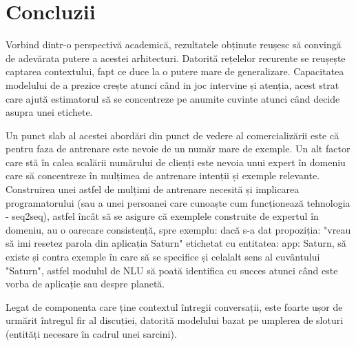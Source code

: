 \chapter{Concluzii}

Vorbind dintr-o perspectivă academică, rezultatele obținute reușesc să convingă de adevărata putere a acestei arhitecturi.
Datorită rețelelor recurente se reușește captarea contextului, fapt ce duce la o putere mare de generalizare. Capacitatea modelului de a prezice crește atunci când in joc intervine și atenția, acest strat care ajută estimatorul să se concentreze pe anumite cuvinte atunci când decide asupra unei etichete.

Un punct slab al acestei abordări din punct de vedere al comercializării este că pentru faza de antrenare este nevoie de un număr mare de exemple. Un alt factor care stă în calea scalării numărului de clienți este nevoia unui expert în domeniu care să concentreze în mulțimea de antrenare intenții și exemple relevante. Construirea unei astfel de mulțimi de antrenare necesită și implicarea programatorului (sau a unei persoanei care cunoaște cum funcționează tehnologia - seq2seq), astfel încât să se asigure că exemplele construite de expertul în domeniu, au o oarecare consistență, spre exemplu: dacă s-a dat propoziția: "vreau să imi resetez parola din aplicația Saturn" etichetat cu entitatea: app: Saturn, să existe și contra exemple în care să se specifice și celalalt sens al cuvântului "Saturn", astfel modulul de NLU să poată identifica cu succes atunci când este vorba de aplicație sau despre planetă.

Legat de componenta care ține contextul întregii conversații, este foarte ușor de urmărit întregul fir al discuției, datorită modelului bazat pe umplerea de sloturi (entități necesare în cadrul unei sarcini).